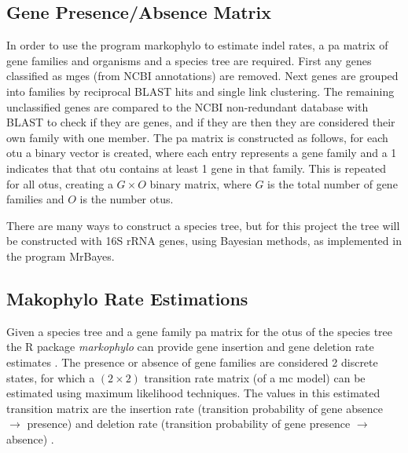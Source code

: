 \subsection{Gene Presence/Absence Matrix}
In order to use the program markophylo to estimate indel rates, a \ac{pa} matrix of gene families and organisms and a species tree are required.
First any genes classified as \ac{mge}s (from NCBI annotations) are removed.
Next genes are grouped into families by reciprocal BLAST hits and single link clustering.
The remaining unclassified genes are compared to the NCBI non-redundant database with BLAST to check if they are genes, and if they are then they are considered their own family with one member.
The \ac{pa} matrix is constructed as follows, for each \ac{otu} a binary vector is created, where each entry represents a gene family and a 1 indicates that that \ac{otu} contains at least 1 gene in that family.
This is repeated for all \ac{otu}s, creating a $G \times O$ binary matrix, where $G$ is the total number of gene families and $O$ is the number \ac{otu}s.\par
There are many ways to construct a species tree, but for this project the tree will be constructed with 16S rRNA genes, using Bayesian methods, as implemented in the program MrBayes.
\subsection{Makophylo Rate Estimations}
Given a species tree and a gene family \ac{pa} matrix for the \ac{otu}s of the species tree the R package \textit{markophylo} can provide gene insertion and gene deletion rate estimates \citep{marko}.
The presence or absence of gene families are considered 2 discrete states, for which a $(2\times 2)$ transition rate matrix (of a \ac{mc} model) can be estimated using maximum likelihood techniques.
The values in this estimated transition matrix are the insertion rate (transition probability of gene absence $\to$ presence) and deletion rate (transition probability of gene presence $\to$ absence) \citep{marko}.

